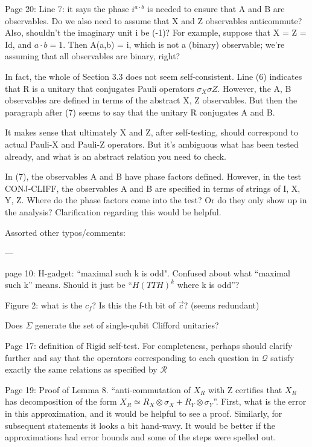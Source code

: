 \documentclass[12pt]{article}
\begin{document}
Page 20: Line 7: it says the phase $i^{a \cdot b}$ is needed to ensure that A and B are observables. Do we also need to assume that X and Z observables anticommute? Also, shouldn’t the imaginary unit i be (-1)? For example, suppose that X = Z = Id, and $a \cdot b = 1$. Then A(a,b) = i, which is not a (binary) observable; we’re assuming that all observables are binary, right?

In fact, the whole of Section 3.3 does not seem self-consistent. Line (6) indicates that R is a unitary that conjugates Pauli operators $\sigma_X \sigma Z$. However, the A, B observables are defined in terms of the abstract X, Z observables. But then the paragraph after (7) seems to say that the unitary R conjugates A and B. 

It makes sense that ultimately X and Z, after self-testing, should correspond to actual Pauli-X and Pauli-Z operators. But it’s ambiguous what has been tested already, and what is an abstract relation you need to check. 

In (7), the observables A and B have phase factors defined. However, in the test CONJ-CLIFF, the observables A and B are specified in terms of strings of I, X, Y, Z. Where do the phase factors come into the test? Or do they only show up in the analysis? Clarification regarding this would be helpful.


Assorted other typos/comments:

---


page 10: H-gadget: “maximal such k is odd". Confused about what “maximal such k” means. Should it just be “$H(TTH)^k$ where k is odd”?

Figure 2: what is the $c_f$? Is this the f-th bit of $\vec{c}$? (seems redundant)

Does $\Sigma$ generate the set of single-qubit Clifford unitaries?

Page 17: definition of Rigid self-test. For completeness, perhaps should clarify further and say that the operators corresponding to each question in $\mathcal{Q}$ satisfy exactly the same relations as specified by $\mathcal{R}$

Page 19: Proof of Lemma 8. “anti-commutation of $X_R$ with Z certifies that $X_R$ has decomposition of the form $X_R \simeq R_X \otimes \sigma_X + R_Y \otimes \sigma_Y$”. First, what is the error in this approximation, and it would be helpful to see a proof. Similarly, for subsequent statements it looks a bit hand-wavy. It would be better if the approximations had error bounds and some of the steps were spelled out. 
\end{document}
